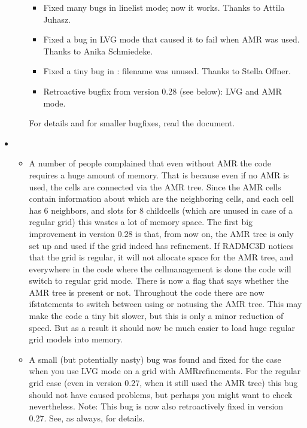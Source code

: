 \documentclass[letterpaper,10pt,english]{sphinxmanual}
\begin{document}
\begin{itemize}
\begin{itemize}
\begin{itemize}
\item {} 
Fixed many bugs in linelist mode; now it works. Thanks to Attila
Juhasz.

\item {} 
Fixed a bug in LVG mode that caused it to fail when AMR was used.
Thanks to Anika Schmiedeke.

\item {} 
Fixed a tiny bug in : filename was
unused. Thanks to Stella Offner.

\item {} 
Retroactive bugfix from version 0.28 (see below): LVG and AMR mode.

\end{itemize}

For details and for smaller bugfixes, read the  document.

\end{itemize}

\item {} 
\begin{itemize}
\item {} 
A number of people complained that even without AMR the code
requires a huge amount of memory. That is because even if no AMR is
used, the cells are connected via the AMR tree. Since the AMR cells
contain information about which are the neighboring cells, and each cell
has 6 neighbors, and slots for 8 child\sphinxhyphen{}cells (which are unused in case
of a regular grid) this wastes a lot of memory space. The first big
improvement in version 0.28 is that, from now on, the AMR tree is only
set up and used if the grid indeed has refinement. If RADMC\sphinxhyphen{}3D notices
that the grid is regular, it will not allocate space for the AMR tree,
and everywhere in the code where the cell\sphinxhyphen{}management is done the code
will switch to regular grid mode. There is now a flag 
that says whether the AMR tree is present or
not. Throughout the code there are now if\sphinxhyphen{}statements to switch between
using or not\sphinxhyphen{}using the AMR tree. This may make the code a tiny bit
slower, but this is only a minor reduction of speed. But as a result it
should now be much easier to load huge regular grid models into memory.

\item {} 
A small (but potentially nasty) bug was found and fixed for the case
when you use LVG mode on a grid with AMR\sphinxhyphen{}refinements. For the regular
grid case (even in version 0.27, when it still used the AMR tree) this
bug should not have caused problems, but perhaps you might want to check
nevertheless. Note: This bug is now also retroactively fixed in version
0.27. See, as always,  for details.


\end{itemize}
\end{itemize}
\end{document}
